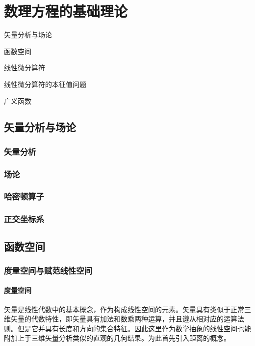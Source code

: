 \chapter{数理方程的基础理论}

\begin{introduction}   
	\item 矢量分析与场论
	\item 函数空间
	\item 线性微分算符
	\item 线性微分算符的本征值问题
	\item 广义函数
\end{introduction}

\section{矢量分析与场论}

\subsection{矢量分析}

\subsection{场论}

\subsection{哈密顿算子}

\subsection{正交坐标系}


\section{函数空间}


\subsection{度量空间与赋范线性空间}

\subsubsection{度量空间}
	
	矢量是线性代数中的基本概念，作为构成线性空间的元素。矢量具有类似于正常三维矢量的代数特性，即矢量具有加法和数乘两种运算，并且遵从相对应的运算法则。但是它并具有长度和方向的集合特征。因此这里作为数学抽象的线性空间也能附加上于三维矢量分析类似的直观的几何结果。为此首先引入距离的概念。	

